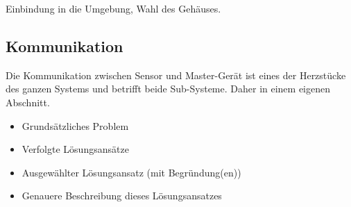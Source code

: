 Einbindung in die Umgebung, Wahl des Geh\"auses.


\subsection{Kommunikation}
\label{subsec:kommunikation}

Die   Kommunikation  zwischen   Sensor  und   Master-Ger\"at  ist   eines  der
Herzst\"ucke des ganzen Systems und betrifft beide Sub-Systeme. Daher in einem
eigenen Abschnitt.

\begin{itemize}
    \item
        Grunds\"atzliches Problem
    \item
        Verfolgte L\"osungsans\"atze
    \item
        Ausgew\"ahlter L\"osungsansatz (mit Begr\"undung(en))
    \item
        Genauere Beschreibung dieses L\"osungsansatzes
\end{itemize}
